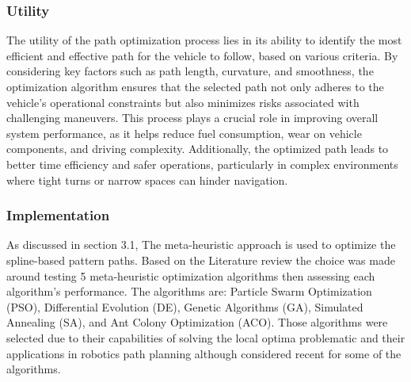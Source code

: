 \subsubsection{Utility}
The utility of the path optimization process lies in its ability to identify the most efficient and effective path for the 
vehicle to follow, based on various criteria. By considering key factors such as path length, curvature, and smoothness, 
the optimization algorithm ensures that the selected path not only adheres to the vehicle's operational constraints but 
also minimizes risks associated with challenging maneuvers. This process plays a crucial role in improving overall system 
performance, as it helps reduce fuel consumption, wear on vehicle components, and driving complexity. Additionally, 
the optimized path leads to better time efficiency and safer operations, particularly in complex environments where 
tight turns or narrow spaces can hinder navigation.

\subsubsection{Implementation}
As discussed in section 3.1, The meta-heuristic approach is used to optimize the spline-based pattern paths. 
Based on the Literature review the choice was made around testing 5 meta-heuristic optimization algorithms then 
assessing each algorithm's performance. The algorithms are: Particle Swarm Optimization (PSO), Differential Evolution (DE),
Genetic Algorithms (GA), Simulated Annealing (SA), and Ant Colony Optimization (ACO). Those algorithms were selected due 
to their capabilities of solving the local optima problematic and their applications in robotics path planning although 
considered recent for some of the algorithms. 


